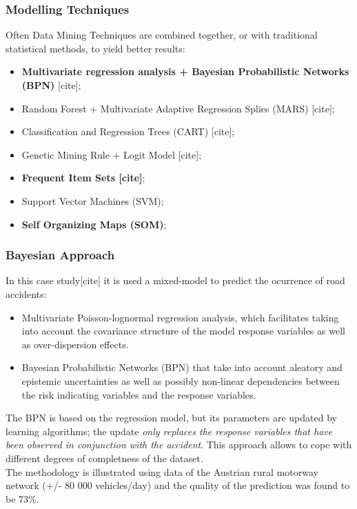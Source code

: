 \documentclass[hyperref={pdfpagelabels=true}]{beamer}
\begin{document}
\begin{frame}
\frametitle{Modelling Techniques}
Often Data Mining Techniques are combined together, or with traditional statistical methods, to yield better results:
\begin{itemize}
\item \textbf{Multivariate regression analysis + Bayesian Probabilistic Networks (BPN)} [cite];
\item Random Forest + Multivariate Adaptive Regression Splies (MARS) [cite];
\item Classification and Regression Trees (CART) [cite];
\item Genetic Mining Rule + Logit Model [cite];
\item \textbf{Frequent Item Sets [cite]};
\item Support Vector Machines (SVM); 
\item \textbf{Self Organizing Maps (SOM)};
\end{itemize}
\end{frame}

\begin{frame}
\frametitle{Bayesian Approach}
In this case study[cite] it is used a mixed-model to predict the ocurrence of road accidents:
\begin{itemize}
\item<2-> Multivariate Poisson-lognormal regression analysis, which facilitates taking into account the covariance structure of the model response variables as well as
over-dispersion effects.
\item<3->  Bayesian Probabilistic Networks (BPN) that take into account aleatory and epistemic uncertainties as well as possibly non-linear dependencies between the risk indicating variables and the response variables.
\end{itemize}
The BPN is based on the regression model, but its parameters are updated by learning algorithms; the update \textit{only replaces the response variables that have been observed in conjunction with the accident}. This approach allows to cope with different degrees of completness of the dataset.\\
The methodology is illustrated using data of the Austrian rural motorway network (+/- 80 000 vehicles/day) and the quality of the prediction was found to be 73\%.
\end{frame}
\end{document}
